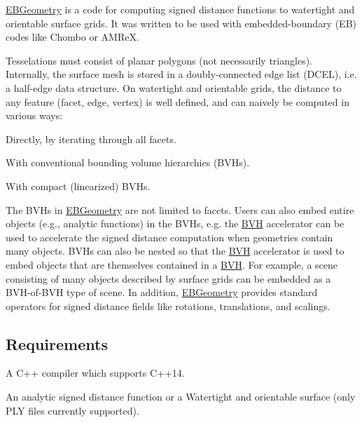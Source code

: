\hyperlink{namespaceEBGeometry}{E\+B\+Geometry} is a code for computing signed distance functions to watertight and orientable surface grids. It was written to be used with embedded-\/boundary (EB) codes like Chombo or A\+M\+ReX.

Tesselations must consist of planar polygons (not necessarily triangles). Internally, the surface mesh is stored in a doubly-\/connected edge list (D\+C\+EL), i.\+e. a half-\/edge data structure. On watertight and orientable grids, the distance to any feature (facet, edge, vertex) is well defined, and can naively be computed in various ways\+:


\begin{DoxyItemize}
\item Directly, by iterating through all facets.
\item With conventional bounding volume hierarchies (B\+V\+Hs).
\item With compact (linearized) B\+V\+Hs.
\end{DoxyItemize}

The B\+V\+Hs in \hyperlink{namespaceEBGeometry}{E\+B\+Geometry} are not limited to facets. Users can also embed entire objects (e.\+g., analytic functions) in the B\+V\+Hs, e.\+g. the \hyperlink{namespaceBVH}{B\+VH} accelerator can be used to accelerate the signed distance computation when geometries contain many objects. B\+V\+Hs can also be nested so that the \hyperlink{namespaceBVH}{B\+VH} accelerator is used to embed objects that are themselves contained in a \hyperlink{namespaceBVH}{B\+VH}. For example, a scene consisting of many objects described by surface grids can be embedded as a B\+V\+H-\/of-\/\+B\+VH type of scene. In addition, \hyperlink{namespaceEBGeometry}{E\+B\+Geometry} provides standard operators for signed distance fields like rotations, translations, and scalings.



\subsection*{Requirements }


\begin{DoxyItemize}
\item A C++ compiler which supports C++14.
\item An analytic signed distance function or a Watertight and orientable surface (only P\+LY files currently supported).
\end{DoxyItemize}

